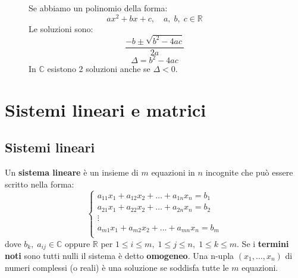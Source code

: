 \documentclass[a4paper]{article}
\theoremstyle{break}
\theoremstyle{break}
\theoremstyle{break}
\theoremstyle{break}
\begin{document}
\begin{figure}[H]
  \begin{define}
    Se abbiamo un polinomio della forma:
    \[
      ax^2 + bx + c, \quad a,\;b,\;c \in \mathbb{R}
    \]
    Le soluzioni sono:
    \[
      \frac{-b \pm \sqrt{b^2 -4ac}}{2a}
    \]
    \[
      \Delta = b^2 - 4ac
    \]
    In \( \mathbb{C} \) esistono 2 soluzioni anche se \( \Delta < 0 \).
  \end{define}
\end{figure}

\section{Sistemi lineari e matrici}
\subsection{Sistemi lineari}
Un \textbf{sistema lineare} è un insieme di \( m \) equazioni in \( n \) incognite
che può essere scritto nella forma:
\[
  \begin{cases}
    a_{11}x_1 + a_{12}x_2 + \ldots + a_{1n}x_n = b_1 \\
    a_{21}x_1 + a_{22}x_2 + \ldots + a_{2n}x_n = b_2 \\
    \vdots                                           \\
    a_{m1}x_1 + a_{m2}x_2 + \ldots + a_{mn}x_n = b_m \\
  \end{cases}
\]
dove \( b_k,\; a_{ij} \in \mathbb{C} \) oppure \( \mathbb{R} \) per \( 1 \le i \le m,\;
1 \le j \le n,\; 1 \le k \le m\). Se i \textbf{termini noti} sono tutti nulli il sistema è detto
\textbf{omogeneo}. Una n-upla \( (x_1, \ldots, x_n) \) di numeri complessi (o reali) è
una soluzione se soddisfa tutte le \( m \) equazioni.
\end{document}
